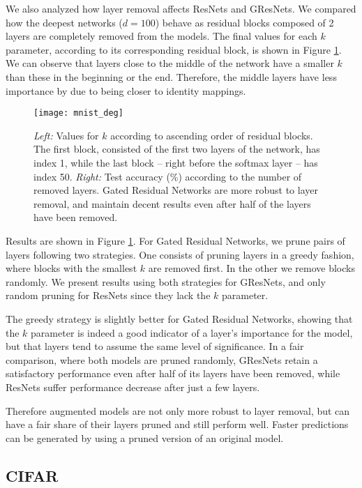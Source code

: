 \documentclass{article} \RequirePackage{amsmath,amsthm,amsfonts,amssymb}
\begin{document}
We also analyzed how layer removal affects ResNets and GResNets. We compared how the deepest networks ($d = 100$) behave as residual blocks composed of 2 layers are completely removed from the models. The final values for each $k$ parameter, according to its corresponding residual block, is shown in Figure \ref{pruning}. We can observe that layers close to the middle of the network have a smaller $k$ than these in the beginning or the end. Therefore, the middle layers have less importance by due to being closer to identity mappings.


\begin{figure}[!ht]
  \centering
    \texttt{[image: mnist\_deg]}
  \caption{\textit{Left: } Values for $k$ according to ascending order of residual blocks. The first block, consisted of the first two layers of the network, has index 1, while the last block -- right before the softmax layer -- has index 50. \textit{Right:} Test accuracy (\%) according to the number of removed layers. Gated Residual Networks are more robust to layer removal, and maintain decent results even after half of the layers have been removed. }
\label{pruning}
\end{figure}

Results are shown in Figure \ref{pruning}. For Gated Residual Networks, we prune pairs of layers following two strategies. One consists of pruning layers in a greedy fashion, where blocks with the smallest $k$ are removed first. In the other we remove blocks randomly. We present results using both strategies for GResNets, and only random pruning for ResNets since they lack the $k$ parameter.

The greedy strategy is slightly better for Gated Residual Networks, showing that the $k$ parameter is indeed a good indicator of a layer's importance for the model, but that layers tend to assume the same level of significance. In a fair comparison, where both models are pruned randomly, GResNets retain a satisfactory performance even after half of its layers have been removed, while ResNets suffer performance decrease after just a few layers.

Therefore augmented models are not only more robust to layer removal, but can have a fair share of their layers pruned and still perform well. Faster predictions can be generated by using a pruned version of an original model.



\subsection{CIFAR}
\end{document}
